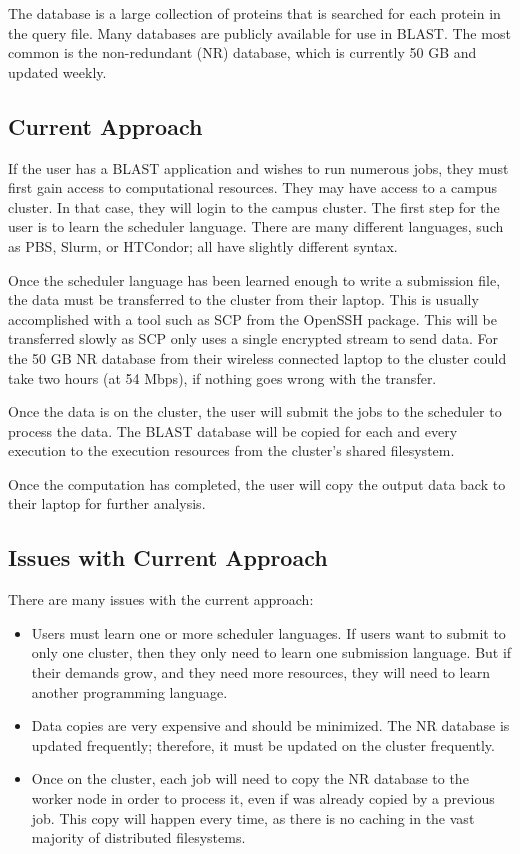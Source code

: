 The database is a large collection of proteins that is searched for each protein in the query file.  Many databases are publicly available for use in BLAST.  The most common is the non-redundant (NR) database, which is currently 50 GB and updated weekly.

\subsection{Current Approach}


If the user has a BLAST application and wishes to run numerous jobs, they must first gain access to computational resources.  They may have access to a campus cluster.  In that case, they will login to the campus cluster.  The first step for the user is to learn the scheduler language.  There are many different languages, such as PBS, Slurm, or HTCondor; all  have slightly different syntax.

Once the scheduler language has been learned enough to write a submission file, the data must be transferred to the cluster from their laptop.  This is usually accomplished with a tool such as SCP from the OpenSSH \cite{openssh} package.  This will be transferred slowly as SCP only uses a single encrypted stream to send data.  For the 50 GB NR database from their wireless connected laptop to the cluster could take two hours (at 54 Mbps), if nothing goes wrong with the transfer.

Once the data is on the cluster, the user will submit the jobs to the scheduler to process the data.  The BLAST database will be copied for each and every execution to the execution resources from the cluster's shared filesystem.

Once the computation has completed, the user will copy the output data back to their laptop for further analysis.

\subsection{Issues with Current Approach}

There are many issues with the current approach:

\begin{itemize}
	\item Users must learn one or more scheduler languages.  If users want to submit to only one cluster, then they only need to learn one submission language.  But if their demands grow, and they need more resources, they will need to learn another programming language.
	\item Data copies are very expensive and should be minimized.  The NR database is updated frequently;  therefore, it must be updated on the cluster frequently.
	\item Once on the cluster, each job will need to copy the NR database to the worker node in order to process it, even if was already copied by a previous job.  This copy will happen every time, as there is no caching in the vast majority of distributed filesystems.
\end{itemize}








